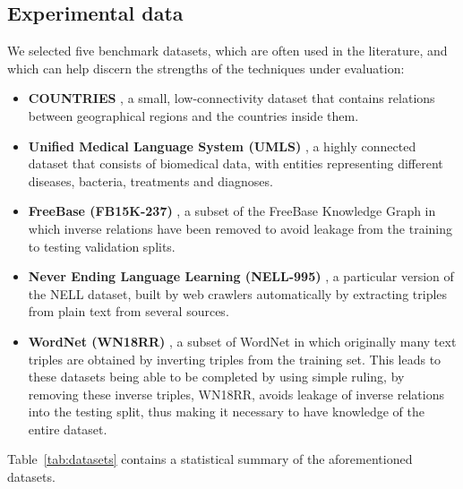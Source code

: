 \subsection{Experimental data}

We selected five benchmark datasets, which are often used in the literature, and which can help discern the strengths of the techniques under evaluation:

\begin{itemize}
    \item \textbf{COUNTRIES}
    , a small, low-connectivity dataset that contains relations between geographical regions and the countries inside them.
    
    \item \textbf{Unified Medical Language System (UMLS)}
    , a highly connected dataset that consists of biomedical data, with entities representing different diseases, bacteria, treatments and diagnoses.
    
    \item \textbf{FreeBase (FB15K-237)}
    , a subset of the FreeBase Knowledge Graph in which inverse relations have been removed to avoid leakage from the training to testing validation splits.
    
    \item \textbf{Never Ending Language Learning (NELL-995)}
    , a particular version of the NELL dataset, built by web crawlers automatically by extracting triples from plain text from several sources.
    
    \item \textbf{WordNet (WN18RR)}
    , a subset of WordNet in which originally many text triples are obtained by inverting triples from the training set.
    This leads to these datasets being able to be completed by using simple ruling, by removing these inverse triples, WN18RR, avoids leakage of inverse relations into the testing split, thus making it necessary to have knowledge of the entire dataset.
\end{itemize}

Table~\ref{tab:datasets} contains a statistical summary of the aforementioned datasets.




